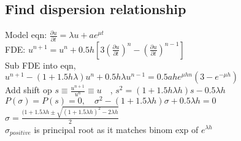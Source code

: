 \documentclass[8pt]{extarticle} %
\begin{document}
\begin{multicols*}{3}
  \subsection{Find dispersion relationship}
  Model eqn: $\frac{\partial u}{\partial t}=\lambda u+ae^{\mu t}$\\
  FDE: \begin{math}
  u^{n+1}=u^n+0.5h\left[3(\frac{\partial u}{\partial t})^n-(\frac{\partial u}{\partial t})^{n-1}\right]
  \end{math}\\
  Sub FDE into eqn,\\
  \begin{math}
  u^{n+1}-(1+1.5h\lambda)u^n+0.5h\lambda u^{n-1}=0.5ahe^{\mu hn}(3-e^{-\mu h})
  \end{math}\\
  Add shift op $s\equiv\frac{u^{n+1}}{u^n}\equiv u \quad$,
  \begin{math}
  s^2=(1+1.5h\lambda h)s - 0.5\lambda h
  \end{math}\\
  \begin{math}
  P(\sigma)=P(s)=0,\quad
  \sigma^2-(1+1.5\lambda h)\sigma + 0.5\lambda h=0
  \end{math}\\
  \begin{math}
  \sigma=\frac{(1+1.5\lambda h\pm \sqrt{(1+1.5\lambda h)^2-2\lambda h}}{2}
  \end{math}\\
  $\sigma_{positive}$ is principal root as it matches binom exp of $e^{\lambda h}$

\end{multicols*}
\end{document}
